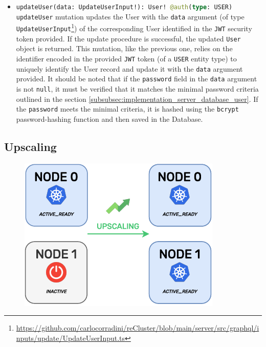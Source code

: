 \begin{itemize}
  \item \lstinline[language=graphql, deletekeywords={type}, morekeywords={[2]{User, UpdateUserInput, @auth}},
    morekeywords={[3]{USER}}, morekeywords={[4]{data, type}}, morekeywords={[5]{updateUser}}]{updateUser(data: UpdateUserInput!): User! @auth(type: USER)}
    \newline
    \texttt{updateUser} mutation updates the User with the \texttt{data}
    argument (of type \texttt{UpdateUserInput}\footnote{\url{https://github.com/carlocorradini/reCluster/blob/main/server/src/graphql/inputs/update/UpdateUserInput.ts}})
    of the corresponding User identified in the \texttt{JWT} security token
    provided. If the update procedure is successful, the updated \texttt{User} object
    is returned.
    \newline
    This mutation, like the previous one, relies on the identifier encoded in
    the provided \texttt{JWT} token (of a \texttt{USER} entity type) to uniquely
    identify the User record and update it with the \texttt{data} argument provided.
    \newline
    It should be noted that if the \texttt{password} field in the \texttt{data}
    argument is not \texttt{null}, it must be verified that it matches the
    minimal password criteria outlined in the section
    \ref{subsubsec:implementation_server_database_user}. If the \texttt{password}
    meets the minimal criteria, it is hashed using the \texttt{bcrypt} password-hashing
    function and then saved in the Database.
\end{itemize}

\subsection{Upscaling}
\label{subsec:implementation_server_upscaling}

\begin{figure}
  \centering
  \includegraphics[width=\linewidth]{images/implementation/upscaling.pdf}
\end{figure}


